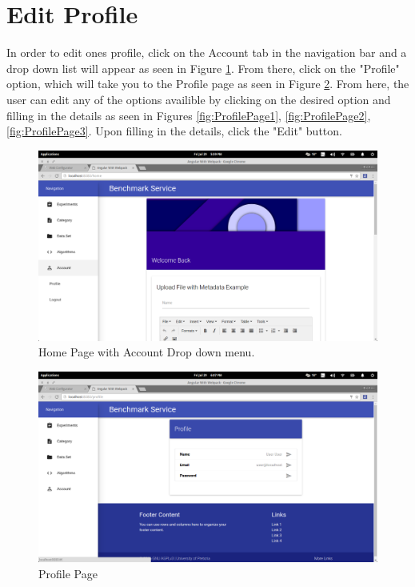 \documentclass[11pt,a4paper]{article}
\begin{document}
\section{Edit Profile}
In order to edit ones profile, click on the Account tab in the navigation bar and a drop down list will appear as seen in Figure \ref{fig:AccountPage}.
From there, click on the "Profile" option, which will take you to the Profile page as seen in Figure \ref{fig:ProfilePage}.
From here, the user can edit any of the options availible by clicking on the desired option and filling in the details as seen in
Figures \ref{fig:ProfilePage1}, \ref{fig:ProfilePage2}, \ref{fig:ProfilePage3}. Upon filling in the details, click the "Edit" button.
\begin{figure}[H]
	\begin{center}
		\includegraphics[scale=0.6]{../Images/User Manual/Account Page.png}
		\caption{Home Page with Account Drop down menu.}
		\label{fig:AccountPage}
	\end{center}  
\end{figure}
\begin{figure}[H]
	\begin{center}
		\includegraphics[scale=0.6]{../Images/User Manual/Profile Page.png}
		\caption{Profile Page}
		\label{fig:ProfilePage}
	\end{center}  
\end{figure}
\end{document}
